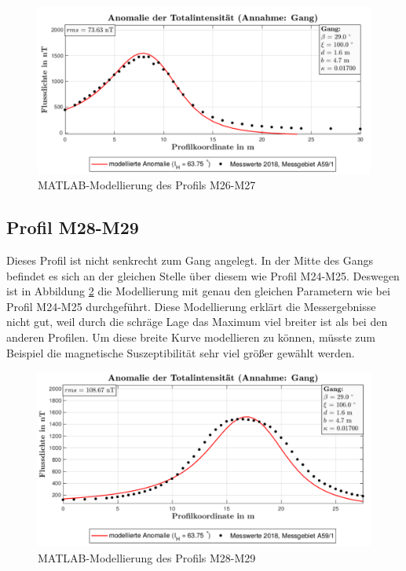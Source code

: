 \begin{figure}
 \centering
 \includegraphics[width=\textwidth]{fig/modM26}
 \caption{MATLAB-Modellierung des Profils M26-M27}
 \label{fig:modM26}
\end{figure}

\subsection{Profil M28-M29}

Dieses Profil ist nicht senkrecht zum Gang angelegt. In der Mitte des Gangs befindet es sich an der gleichen Stelle über diesem wie Profil M24-M25. Deswegen ist in Abbildung \ref{fig:modM28} die Modellierung mit genau den gleichen Parametern wie bei Profil M24-M25 durchgeführt. Diese Modellierung erklärt die Messergebnisse nicht gut, weil durch die schräge Lage das Maximum viel breiter ist als bei den anderen Profilen. Um diese breite Kurve modellieren zu können, müsste zum Beispiel die magnetische Suszeptibilität sehr viel größer gewählt werden.

\begin{figure}
 \centering
 \includegraphics[width=\textwidth]{fig/modM28}
 \caption{MATLAB-Modellierung des Profils M28-M29}
 \label{fig:modM28}
\end{figure}


